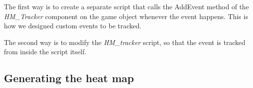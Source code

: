 The first way is to create a separate script that calls the AddEvent method of the \textit{HM\_Tracker} component on the game object whenever the event happens. This is how we designed custom events to be tracked.

The second way is to modify the \textit{HM\_tracker} script, so that the event is tracked from inside the script itself.

\subsection{Generating the heat map}
\label{HowToUse_Generating}
